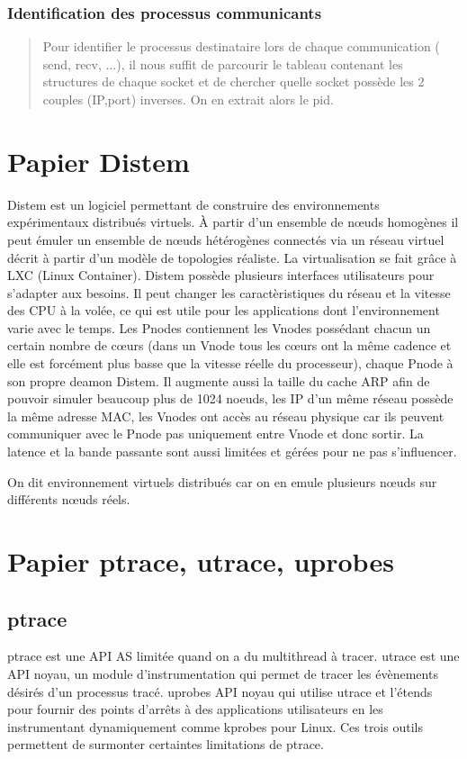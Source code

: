 \documentclass{article}
\begin{document}
\subsubsection{Identification des processus communicants}
\begin{quotation}
Pour identifier le processus destinataire lors de chaque communication
( send, recv, ...), il nous suffit de parcourir le tableau contenant
les structures de chaque socket et de chercher quelle socket possède
les 2 couples (IP,port) inverses. On en extrait alors le pid.
\end{quotation}

\section{Papier Distem}
Distem est un logiciel permettant de construire des environnements
expérimentaux distribués virtuels. À partir d'un ensemble de n\oe uds
homogènes il peut émuler un ensemble de n\oe uds hétérogènes connectés
via un réseau virtuel décrit à partir d'un modèle de topologies
réaliste. La virtualisation se fait grâce à LXC (Linux Container).
Distem possède plusieurs interfaces utilisateurs pour s'adapter aux
besoins. Il peut changer les caractèristiques du réseau et la vitesse
des CPU à la volée, ce qui est utile pour les applications dont
l'environnement varie avec le temps. Les Pnodes contiennent les Vnodes
possédant chacun un certain nombre de c\oe urs (dans un Vnode tous les
c\oe urs ont la même cadence et elle est forcément plus basse que la
vitesse réelle du processeur), chaque Pnode à son propre deamon
Distem. Il augmente aussi la taille du cache ARP afin de pouvoir
simuler beaucoup plus de 1024 noeuds, les IP d'un même réseau possède
la même adresse MAC, les Vnodes ont accès au réseau physique car ils
peuvent communiquer avec le Pnode pas uniquement entre Vnode et donc
sortir. La latence et la bande passante sont aussi limitées et gérées
pour ne pas s'influencer.

On dit environnement virtuels distribués car on en emule plusieurs
n\oe uds sur différents n\oe uds réels.

\section{Papier ptrace, utrace, uprobes}
\subsection{ptrace}
ptrace est une API AS limitée quand on a du multithread à
tracer. utrace est une API noyau, un module d'instrumentation qui
permet de tracer les évènements désirés d'un processus tracé. uprobes
API noyau qui utilise utrace et l'étends pour fournir des points
d'arrêts à des applications utilisateurs en les instrumentant
dynamiquement comme kprobes pour Linux. Ces trois outils permettent de
surmonter certaintes limitations de ptrace.
\end{document}
